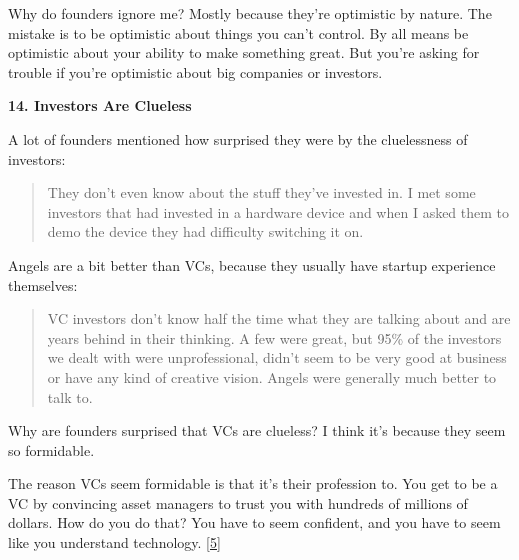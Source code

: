                   Why do founders ignore me? Mostly because they're optimistic
                  by nature. The mistake is to be optimistic about things you
                  can't control. By all means be optimistic about your ability
                  to make something great. But you're asking for trouble if
                  you're optimistic about big companies or investors.


                  \textbf{14. Investors Are Clueless}

A lot of founders
                  mentioned how surprised they were by the cluelessness of
                  investors:
                  \begin{quote}

                    They don't even know about the stuff they've invested in. I
                    met some investors that had invested in a hardware device
                    and when I asked them to demo the device they had difficulty
                    switching it on.
                  
\end{quote}

                  Angels are a bit better than VCs, because they usually have
                  startup experience themselves:
                  \begin{quote}

                    VC investors don't know half the time what they are talking
                    about and are years behind in their thinking. A few were
                    great, but 95\% of the investors we dealt with were
                    unprofessional, didn't seem to be very good at business or
                    have any kind of creative vision. Angels were generally much
                    better to talk to.
                  
\end{quote}

                  Why are founders surprised that VCs are clueless? I think it's
                  because they seem so formidable.

The reason VCs
                  seem formidable is that it's their profession to. You get to
                  be a VC by convincing asset managers to trust you with
                  hundreds of millions of dollars. How do you do that? You have
                  to seem confident, and you have to seem like you understand
                  technology.
                  [\href{\#f5n}{5}]


